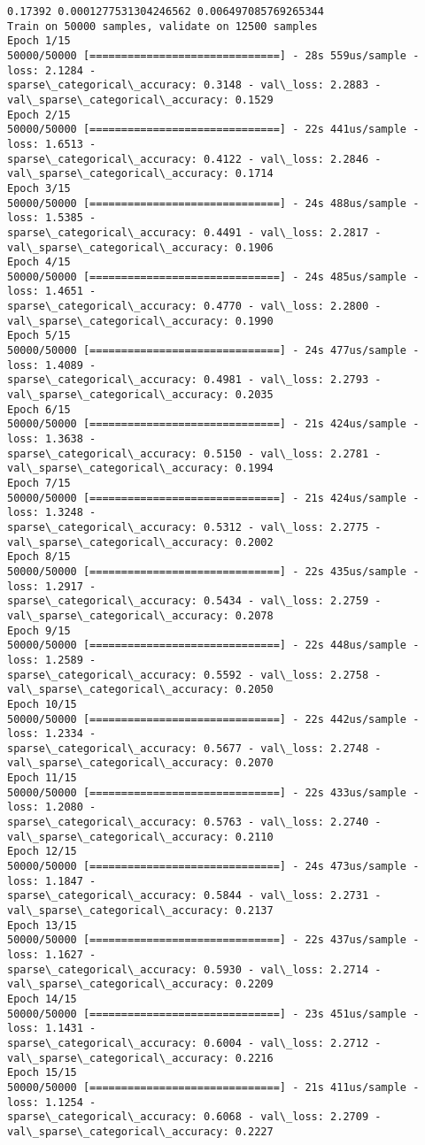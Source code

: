 \documentclass[11pt]{article}
\begin{document}
    \begin{Verbatim}[commandchars=\\\{\}]
0.17392 0.0001277531304246562 0.006497085769265344
Train on 50000 samples, validate on 12500 samples
Epoch 1/15
50000/50000 [==============================] - 28s 559us/sample - loss: 2.1284 -
sparse\_categorical\_accuracy: 0.3148 - val\_loss: 2.2883 -
val\_sparse\_categorical\_accuracy: 0.1529
Epoch 2/15
50000/50000 [==============================] - 22s 441us/sample - loss: 1.6513 -
sparse\_categorical\_accuracy: 0.4122 - val\_loss: 2.2846 -
val\_sparse\_categorical\_accuracy: 0.1714
Epoch 3/15
50000/50000 [==============================] - 24s 488us/sample - loss: 1.5385 -
sparse\_categorical\_accuracy: 0.4491 - val\_loss: 2.2817 -
val\_sparse\_categorical\_accuracy: 0.1906
Epoch 4/15
50000/50000 [==============================] - 24s 485us/sample - loss: 1.4651 -
sparse\_categorical\_accuracy: 0.4770 - val\_loss: 2.2800 -
val\_sparse\_categorical\_accuracy: 0.1990
Epoch 5/15
50000/50000 [==============================] - 24s 477us/sample - loss: 1.4089 -
sparse\_categorical\_accuracy: 0.4981 - val\_loss: 2.2793 -
val\_sparse\_categorical\_accuracy: 0.2035
Epoch 6/15
50000/50000 [==============================] - 21s 424us/sample - loss: 1.3638 -
sparse\_categorical\_accuracy: 0.5150 - val\_loss: 2.2781 -
val\_sparse\_categorical\_accuracy: 0.1994
Epoch 7/15
50000/50000 [==============================] - 21s 424us/sample - loss: 1.3248 -
sparse\_categorical\_accuracy: 0.5312 - val\_loss: 2.2775 -
val\_sparse\_categorical\_accuracy: 0.2002
Epoch 8/15
50000/50000 [==============================] - 22s 435us/sample - loss: 1.2917 -
sparse\_categorical\_accuracy: 0.5434 - val\_loss: 2.2759 -
val\_sparse\_categorical\_accuracy: 0.2078
Epoch 9/15
50000/50000 [==============================] - 22s 448us/sample - loss: 1.2589 -
sparse\_categorical\_accuracy: 0.5592 - val\_loss: 2.2758 -
val\_sparse\_categorical\_accuracy: 0.2050
Epoch 10/15
50000/50000 [==============================] - 22s 442us/sample - loss: 1.2334 -
sparse\_categorical\_accuracy: 0.5677 - val\_loss: 2.2748 -
val\_sparse\_categorical\_accuracy: 0.2070
Epoch 11/15
50000/50000 [==============================] - 22s 433us/sample - loss: 1.2080 -
sparse\_categorical\_accuracy: 0.5763 - val\_loss: 2.2740 -
val\_sparse\_categorical\_accuracy: 0.2110
Epoch 12/15
50000/50000 [==============================] - 24s 473us/sample - loss: 1.1847 -
sparse\_categorical\_accuracy: 0.5844 - val\_loss: 2.2731 -
val\_sparse\_categorical\_accuracy: 0.2137
Epoch 13/15
50000/50000 [==============================] - 22s 437us/sample - loss: 1.1627 -
sparse\_categorical\_accuracy: 0.5930 - val\_loss: 2.2714 -
val\_sparse\_categorical\_accuracy: 0.2209
Epoch 14/15
50000/50000 [==============================] - 23s 451us/sample - loss: 1.1431 -
sparse\_categorical\_accuracy: 0.6004 - val\_loss: 2.2712 -
val\_sparse\_categorical\_accuracy: 0.2216
Epoch 15/15
50000/50000 [==============================] - 21s 411us/sample - loss: 1.1254 -
sparse\_categorical\_accuracy: 0.6068 - val\_loss: 2.2709 -
val\_sparse\_categorical\_accuracy: 0.2227
    \end{Verbatim}
\end{document}
